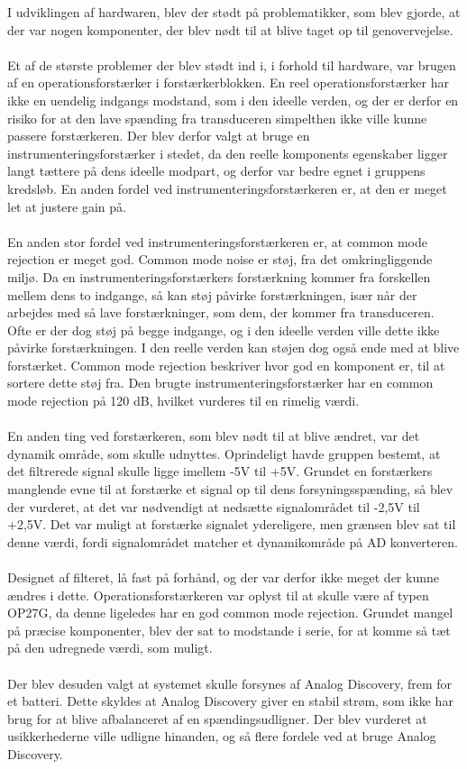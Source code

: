 I udviklingen af hardwaren, blev der stødt på problematikker, som blev gjorde, at der var nogen komponenter, der blev nødt til at blive taget op til genovervejelse.\\
\\
Et af de største problemer der blev stødt ind i, i forhold til hardware, var brugen af en operationsforstærker i forstærkerblokken. En reel operationsforstærker har ikke en uendelig indgangs modstand, som i den ideelle verden, og der er derfor en risiko for at den lave spænding fra transduceren simpelthen ikke ville kunne passere forstærkeren. Der blev derfor valgt at bruge en instrumenteringsforstærker i stedet, da den reelle komponents egenskaber ligger langt tættere på dens ideelle modpart, og derfor var bedre egnet i gruppens kredsløb. En anden fordel ved instrumenteringsforstærkeren er, at den er meget let at justere gain på.\\
\\
En anden stor fordel ved instrumenteringsforstærkeren er, at common mode rejection er meget god. Common mode noise er støj, fra det omkringliggende miljø. Da en instrumenteringsforstærkers forstærkning kommer fra forskellen mellem dens to indgange, så kan støj påvirke forstærkningen, især når der arbejdes med så lave forstærkninger, som dem, der kommer fra transduceren. Ofte er der dog støj på begge indgange, og i den ideelle verden ville dette ikke påvirke forstærkningen. I den reelle verden kan støjen dog også ende med at blive forstærket. Common mode rejection beskriver hvor god en komponent er, til at sortere dette støj fra. Den brugte instrumenteringsforstærker har en common mode rejection på 120 dB, hvilket vurderes til en rimelig værdi. \\
\\
En anden ting ved forstærkeren, som blev nødt til at blive ændret, var det dynamik område, som skulle udnyttes. Oprindeligt havde gruppen bestemt, at det filtrerede signal skulle ligge imellem -5V til +5V. Grundet en forstærkers manglende evne til at forstærke et signal op til dens forsyningsspænding, så blev der vurderet, at det var nødvendigt at nedsætte signalområdet til -2,5V til +2,5V. Det var muligt at forstærke signalet ydereligere, men grænsen blev sat til denne værdi, fordi signalområdet matcher et dynamikområde på AD konverteren.\\ 
\\
Designet af filteret, lå fast på forhånd, og der var derfor ikke meget der kunne ændres i dette. Operationsforstærkeren var oplyst til at skulle være af typen OP27G, da denne ligeledes har en god common mode rejection. Grundet mangel på præcise komponenter, blev der sat to modstande i serie, for at komme så tæt på den udregnede værdi, som muligt. \\
\\
Der blev desuden valgt at systemet skulle forsynes af Analog Discovery, frem for et batteri. Dette skyldes at Analog Discovery giver en stabil strøm, som ikke har brug for at blive afbalanceret af en spændingsudligner. Der blev vurderet at usikkerhederne ville udligne hinanden, og så flere fordele ved at bruge Analog Discovery.\\


